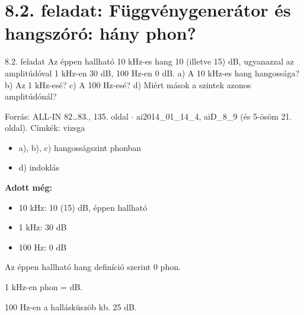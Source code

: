 \section{\texorpdfstring{8.2. feladat: Függvénygenerátor és hangszóró: hány phon?}{8.2. feladat: Függvénygenerátor és hangszóró: hány phon?}}\label{ai8_02}
\setcounter{lepes}{0}
\begin{feladat}{8.2. feladat}
Az éppen hallható 10 kHz-es hang 10 (illetve 15) dB, ugyanazzal az amplitúdóval 1 kHz-en 30 dB, 100 Hz-en 0 dB. a) A 10 kHz-es hang hangossága? b) Az 1 kHz-esé? c) A 100 Hz-esé? d) Miért mások a szintek azonos amplitúdónál?

{\footnotesize\sffamily Forrás: ALL-IN 82\ldots{}83., 135. oldal $\cdot$ ai2014\_01\_14\_4, aiD\_8\_9 (és 5-ösöm 21. oldal). Címkék: vizsga}
\end{feladat}
\begin{keresunk}
\begin{itemize}
\item a), b), c) hangosságszint phonban
\item d) indoklás
\end{itemize}
\end{keresunk}
\begin{jeloles}
\par\smallskip\textbf{Adott még:}
\begin{itemize}
\item 10 kHz: 10 (15) dB, éppen hallható
\item 1 kHz: 30 dB
\item 100 Hz: 0 dB
\end{itemize}
\end{jeloles}

Az éppen hallható hang definíció szerint 0 phon.

\begin{center}\end{center}

1 kHz-en phon = dB.

\begin{center}\end{center}

100 Hz-en a hallásküszöb kb. 25 dB.

\begin{center}\end{center}

